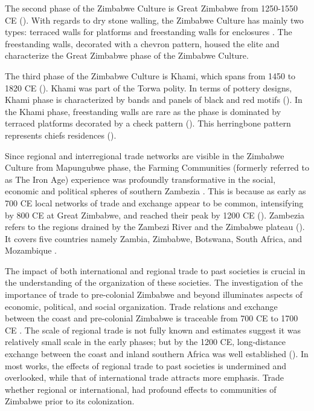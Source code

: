 The second phase of the Zimbabwe Culture is Great Zimbabwe from 1250-1550 CE (\cites{pikirayi2006}{kim2008}). With regards to dry stone walling, the Zimbabwe Culture has mainly two types: terraced walls for platforms and freestanding walls for enclosures \parencite{chirikure2013socio}. The freestanding walls, decorated with a chevron pattern, housed the elite and characterize the Great Zimbabwe phase of the Zimbabwe Culture.

The third phase of the Zimbabwe Culture is Khami, which spans from 1450 to 1820 CE (\cites{manyanga2006}{chirikure2014}).  Khami was  part of the Torwa polity. In terms of pottery designs, Khami phase is characterized by bands and panels of black and red motifs (\cites{huffman2011}{chirikure2013socio}). In the Khami phase, freestanding walls are rare as the phase is dominated by terraced platforms decorated by a check pattern (\cites{huffman2011}{huffman2012}{chirikure2013socio}). This herringbone pattern represents chiefs residences (\cites{pikirayi2007}{huffman2011}).

Since regional and interregional trade networks are visible in the Zimbabwe Culture from Mapungubwe phase, the Farming Communities (formerly referred to as The Iron Age) experience was  profoundly transformative in the social, economic and political spheres of southern Zambezia \parencite{pikirayi2007}. This is because as early as 700 CE local networks of trade and exchange appear to be common, intensifying by 800 CE at Great Zimbabwe, and  reached their peak by 1200 CE (\cites{kusimba1999}{kim2008}). Zambezia refers to the regions drained by the Zambezi River and the Zimbabwe plateau (\cite[][3]{pikirayi2001}). It covers five countries namely Zambia, Zimbabwe, Botswana, South Africa, and Mozambique \parencite{kim2008}.

The impact of both international and regional trade to past societies is crucial in the understanding of the organization of these societies. The investigation of the importance of trade to pre-colonial Zimbabwe and beyond illuminates aspects of economic, political, and social organization. Trade relations and exchange between the coast and pre-colonial Zimbabwe is traceable from 700 CE to 1700 CE \parencite{pwiti2005}. The scale of regional trade is not fully known and estimates suggest it was relatively small scale in the early phases; but by the 1200 CE,  long-distance exchange between the coast and inland southern Africa was well established (\cites{pwiti1991}{pwiti2005}{chiripanhura2017}). In most works, the effects of regional trade to past societies is undermined and overlooked, while that of international trade attracts more emphasis. Trade whether regional or international, had profound effects to communities of Zimbabwe prior to its colonization.

